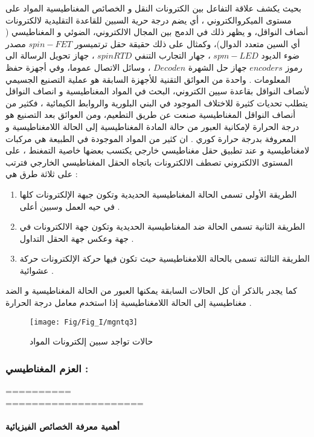 بحيث يكشف علاقة التفاعل بين الكترونات النقل و الخصائص المغناطيسية المواد على مستوى الميكروالكتروني ، أي يضم درجة حرية السبين للقاعدة التقليدية لالكترونات أنصاف النواقل، و يظهر ذلك في الدمج بين المجال الالكتروني، الضوئي و المغناطيسي ( أي السين متعدد الدوال)، وكمثال على ذلك حقيقة حقل ترتمیسور $ spin-FET $ مصدر ضوء الديود $ spm-LED $ ، جهار التجارب التنفي	$ spin RTD  $ ، جهاز تحويل الرسالة الى رموز $ encoders $ جهاز حل الشهرة $ Decoden $ ، وسائل الاتصال عموما، وفي أجهزة حفظ المعلومات .
واحدة من العوائق التقنية للأجهزة السابقة هو عملية التصنيع الجسيمي لأنصاف النواقل بقاعدة سيين الكتروني، البحث في المواد المغناطيسية و انصاف النواقل يتطلب تحديات كثيرة للاختلاف الموجود في البني البلورية والروابط الكيمائية ، فكثير من أنصاف النواقل المغناطيسية صنعت عن طريق التطعيم، ومن العوائق بعد التصنيع هو درجة الحرارة لإمكانية العبور من حالة المادة المغناطيسية إلى الحالة اللامغناطيسية و المعروفة بدرجة حرارة كوري  .
	ان كثير من المواد الموجودة في الطبيعة هي مركبات لامغناطيسية و عند تطبيق حقل مغناطيسي خارجي يكتسب بعضها خاصية التمغنط ، على المستوى الالكتروني تصطف الالكترونات باتجاه الحقل المغناطيسي الخارجي فترتب على ثلاثة طرق هي :
	\begin{enumerate}
		\item 
		الطريقة الأولى تسمى الحالة المغناطيسية الحديدية وتكون جبهة الإلكترونات كلها في حيه العمل وسبين أعلى .
				\item 
		الطريقة الثانية تسمى الحالة ضد المغناطيسية الحديدية وتكون جهة الالكترونات في جهة وعكس جهة الحقل التداول .
		\item
		الطريقة الثالثة تسمى بالحالة اللامغناطيسية حيث تكون فيها حركة الإلكترونات حركة عشوائية .
	\end{enumerate}
	 
	كما يجدر بالذكر أن كل الحالات السابقة يمكنها العبور من الحالة المغناطيسية و الضد مغناطيسية إلى الحالة اللامغناطيسية إذا استخدم معامل درجة الحرارة .
	
	\begin{figure}[h!]
		\centering
		\texttt{[image: Fig/Fig\_I/mgntq3]}
		\caption{حالات تواجد سبين إلكترونات المواد}
		\label{fig:mgntq3}
	\end{figure}
\FloatBarrier

		\subsubsection*{العزم المغناطيسي : }
		 ==========
		 \\
		 =====================
		 
\paragraph{أهمية معرفة الخصائص الفيزيائية }

